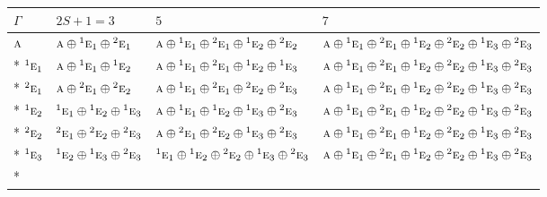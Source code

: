 \documentclass[10pt,a4paper]{article}
\numberwithin{equation}{section}
\newcommand{\irr}[1]{\text{\normalfont\scshape #1}}
\newcommand{\conjpair}[1]{{}^{#1}}
\begin{document}
{\small\setlength{\tabcolsep}{3pt}\begin{longtable}{@{}llll@{}}\toprule
$\Gamma$ & $2S + 1 = 3$ & $5$ & $7$\\\midrule\endhead
\bottomrule\endfoot\endlastfoot
$\irr{a}$ & $\irr{a}\oplus \conjpair{1}\irr{e}_{1}\oplus \conjpair{2}\irr{e}_{1}$ & $\irr{a}\oplus \conjpair{1}\irr{e}_{1}\oplus \conjpair{2}\irr{e}_{1}\oplus \conjpair{1}\irr{e}_{2}\oplus \conjpair{2}\irr{e}_{2}$ & $\irr{a}\oplus \conjpair{1}\irr{e}_{1}\oplus \conjpair{2}\irr{e}_{1}\oplus \conjpair{1}\irr{e}_{2}\oplus \conjpair{2}\irr{e}_{2}\oplus \conjpair{1}\irr{e}_{3}\oplus \conjpair{2}\irr{e}_{3}$\\*
$\conjpair{1}\irr{e}_{1}$ & $\irr{a}\oplus \conjpair{1}\irr{e}_{1}\oplus \conjpair{1}\irr{e}_{2}$ & $\irr{a}\oplus \conjpair{1}\irr{e}_{1}\oplus \conjpair{2}\irr{e}_{1}\oplus \conjpair{1}\irr{e}_{2}\oplus \conjpair{1}\irr{e}_{3}$ & $\irr{a}\oplus \conjpair{1}\irr{e}_{1}\oplus \conjpair{2}\irr{e}_{1}\oplus \conjpair{1}\irr{e}_{2}\oplus \conjpair{2}\irr{e}_{2}\oplus \conjpair{1}\irr{e}_{3}\oplus \conjpair{2}\irr{e}_{3}$\\*
$\conjpair{2}\irr{e}_{1}$ & $\irr{a}\oplus \conjpair{2}\irr{e}_{1}\oplus \conjpair{2}\irr{e}_{2}$ & $\irr{a}\oplus \conjpair{1}\irr{e}_{1}\oplus \conjpair{2}\irr{e}_{1}\oplus \conjpair{2}\irr{e}_{2}\oplus \conjpair{2}\irr{e}_{3}$ & $\irr{a}\oplus \conjpair{1}\irr{e}_{1}\oplus \conjpair{2}\irr{e}_{1}\oplus \conjpair{1}\irr{e}_{2}\oplus \conjpair{2}\irr{e}_{2}\oplus \conjpair{1}\irr{e}_{3}\oplus \conjpair{2}\irr{e}_{3}$\\*
$\conjpair{1}\irr{e}_{2}$ & $\conjpair{1}\irr{e}_{1}\oplus \conjpair{1}\irr{e}_{2}\oplus \conjpair{1}\irr{e}_{3}$ & $\irr{a}\oplus \conjpair{1}\irr{e}_{1}\oplus \conjpair{1}\irr{e}_{2}\oplus \conjpair{1}\irr{e}_{3}\oplus \conjpair{2}\irr{e}_{3}$ & $\irr{a}\oplus \conjpair{1}\irr{e}_{1}\oplus \conjpair{2}\irr{e}_{1}\oplus \conjpair{1}\irr{e}_{2}\oplus \conjpair{2}\irr{e}_{2}\oplus \conjpair{1}\irr{e}_{3}\oplus \conjpair{2}\irr{e}_{3}$\\*
$\conjpair{2}\irr{e}_{2}$ & $\conjpair{2}\irr{e}_{1}\oplus \conjpair{2}\irr{e}_{2}\oplus \conjpair{2}\irr{e}_{3}$ & $\irr{a}\oplus \conjpair{2}\irr{e}_{1}\oplus \conjpair{2}\irr{e}_{2}\oplus \conjpair{1}\irr{e}_{3}\oplus \conjpair{2}\irr{e}_{3}$ & $\irr{a}\oplus \conjpair{1}\irr{e}_{1}\oplus \conjpair{2}\irr{e}_{1}\oplus \conjpair{1}\irr{e}_{2}\oplus \conjpair{2}\irr{e}_{2}\oplus \conjpair{1}\irr{e}_{3}\oplus \conjpair{2}\irr{e}_{3}$\\*
$\conjpair{1}\irr{e}_{3}$ & $\conjpair{1}\irr{e}_{2}\oplus \conjpair{1}\irr{e}_{3}\oplus \conjpair{2}\irr{e}_{3}$ & $\conjpair{1}\irr{e}_{1}\oplus \conjpair{1}\irr{e}_{2}\oplus \conjpair{2}\irr{e}_{2}\oplus \conjpair{1}\irr{e}_{3}\oplus \conjpair{2}\irr{e}_{3}$ & $\irr{a}\oplus \conjpair{1}\irr{e}_{1}\oplus \conjpair{2}\irr{e}_{1}\oplus \conjpair{1}\irr{e}_{2}\oplus \conjpair{2}\irr{e}_{2}\oplus \conjpair{1}\irr{e}_{3}\oplus \conjpair{2}\irr{e}_{3}$\\*

\end{longtable}}
\end{document}
